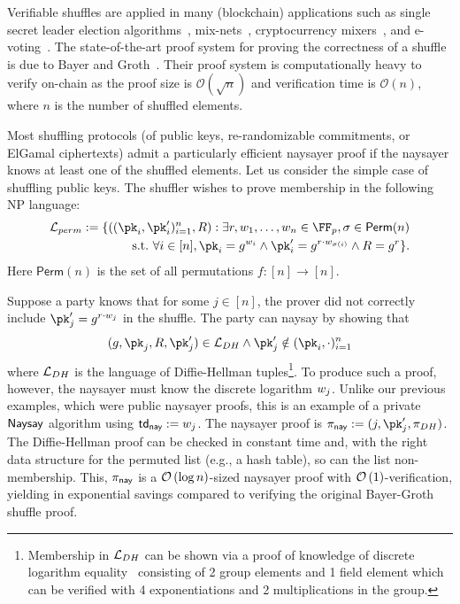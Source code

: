 Verifiable shuffles are applied in many (blockchain) applications such as single secret leader election algorithms~\cite{AFT:Boneh20}, mix-nets~\cite{CACM:Chaum81}, cryptocurrency mixers~\cite{EPRINT:SNBB19}, and e-voting~\cite{USENIX:Adida08}. The state-of-the-art proof system for proving the correctness of a shuffle is due to Bayer and Groth~\cite{EC:BayGro12}. Their proof system is computationally heavy to verify on-chain as the proof size is $\mathcal{O}(\sqrt{n})$ and verification time is $\mathcal{O}(n)$, where $n$ is the number of shuffled elements. 

Most shuffling protocols (of public keys, re-randomizable commitments, or ElGamal ciphertexts) admit a particularly efficient naysayer proof if the naysayer knows at least one of the shuffled elements. Let us consider the simple case of shuffling public keys. The shuffler wishes to prove membership in the following  NP language:
\begin{align*}%
    \Lang_{perm}:= \{ ((\pk_i,\pk_i')_{i=1}^n,R) : \exists r,\witness_1,\dots,\witness_n \in \FF_p, \sigma \in\mathsf{Perm}(n) \\
    \suchthat \forall i\in[n], \pk_i = g^{\witness_i} \land \pk_i' = g^{r \cdot \witness_{\sigma(i)}} \land R = g^r
    \}.
\end{align*}
Here $\mathsf{Perm}(n)$ is the set of all permutations $f:[n]\rightarrow[n]$.

Suppose a party knows that for some $j\in[n]$, the prover did not correctly include $\pk_j' = g^{r\cdot \witness_j}$ in the shuffle. The party can naysay by showing that 
\[
    (g,\pk_j,R,\pk_j')\in\Lang_{DH}\land \pk_j' \notin (\pk_i,\cdot)_{i=1}^n
\]
where $\mathcal{L}_{DH}$ is the language of Diffie-Hellman tuples\footnote{Membership in $\mathcal{L}_{DH}$ can be shown via a proof of knowledge of discrete logarithm equality~\cite{C:ChaPed92} consisting of 2 group elements and 1 field element which can be verified with 4 exponentiations and 2 multiplications in the group.}. To produce such a proof, however, the naysayer must know the discrete logarithm $w_j$. Unlike our previous examples, which were public naysayer proofs, this is an example of a private $\mathsf{Naysay}$ algorithm using $\mathsf{td}_{\mathsf{nay}} := w_j$. The naysayer proof is $\pi_\nay := (j, \pk_j', \pi_{DH})$. The Diffie-Hellman proof can be checked in constant time and, with the right data structure for the permuted list (e.g., a hash table), so can the list non-membership. This, $\pi_{\mathsf{nay}}$ is a $\mathcal{O}\left(\log{n}\right)$-sized naysayer proof with $\mathcal{O}\left(1\right)$-verification, yielding in exponential savings compared to verifying the original Bayer-Groth shuffle proof.

